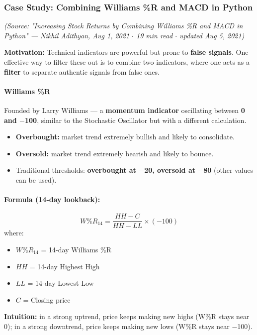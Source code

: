 \documentclass[12pt,openany]{book}
\begin{document}
\subsubsection{Case Study: Combining Williams \%R and MACD in Python}

\emph{(Source: "Increasing Stock Returns by Combining Williams \%R and MACD in Python" --- Nikhil Adithyan, Aug 1, 2021 \(\cdot\) 19 min read \(\cdot\) updated Aug 5, 2021)}

\textbf{Motivation:} Technical indicators are powerful but prone to \textbf{false signals}. One effective way to filter these out is to combine two indicators, where one acts as a \textbf{filter} to separate authentic signals from false ones.

\paragraph{Williams \%R}

Founded by Larry Williams --- a \textbf{momentum indicator} oscillating between \textbf{0 and \(-\)100}, similar to the Stochastic Oscillator but with a different calculation.

\begin{itemize}[leftmargin=*]
    \item \textbf{Overbought:} market trend extremely bullish and likely to consolidate.
    \item \textbf{Oversold:} market trend extremely bearish and likely to bounce.
    \item Traditional thresholds: \textbf{overbought at \(-\)20, oversold at \(-\)80} (other values can be used).
\end{itemize}

\paragraph{Formula (14-day lookback):}
\[
W\%R_{14} = \frac{HH - C}{HH - LL} \times (-100)
\]
where:
\begin{itemize}[leftmargin=*]
    \item \(W\%R_{14}\) = 14-day Williams \%R
    \item \(HH\) = 14-day Highest High
    \item \(LL\) = 14-day Lowest Low
    \item \(C\) = Closing price
\end{itemize}

\textbf{Intuition:} in a strong uptrend, price keeps making new highs (W\%R stays near 0); in a strong downtrend, price keeps making new lows (W\%R stays near \(-\)100).
\end{document}
